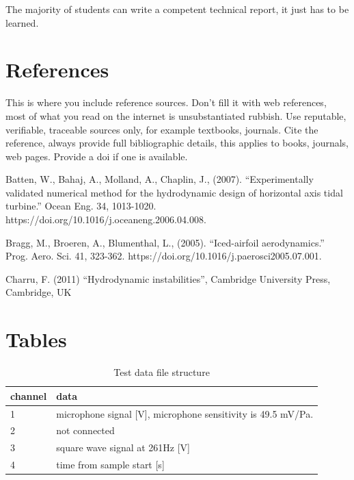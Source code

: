 \documentclass[11pt,a4]{article}
\begin{document}
The majority of students can write a competent technical report, it just has to be learned.

\section{References}

This is where you include reference sources. Don't fill it with web references, most of what you read on the internet is unsubstantiated rubbish. Use reputable, verifiable, traceable sources only, for example textbooks, journals. Cite the reference, always provide full bibliographic details, this applies to books, journals, web pages. Provide a doi if one is available.

Batten, W., Bahaj, A., Molland, A., Chaplin, J., (2007). ``Experimentally validated numerical method for the hydrodynamic design of horizontal axis tidal turbine.'' Ocean Eng. 34, 1013-1020. https://doi.org/10.1016/j.oceaneng.2006.04.008.

Bragg, M., Broeren, A., Blumenthal, L., (2005). ``Iced-airfoil aerodynamics.'' Prog. Aero. Sci. 41, 323-362. https://doi.org/10.1016/j.paerosci2005.07.001.

Charru, F. (2011) ``Hydrodynamic instabilities'', Cambridge University Press, Cambridge, UK





\section{Tables}


\begin{longtable}{ll}
\caption{Test data file structure}\\
\label{tab:struct}
channel & data\\
\hline
1 & microphone signal [V], microphone sensitivity is 49.5 mV/Pa. \\
2 & not connected\\
3 & square wave signal at 261Hz [V] \\
4 & time from sample start [s]\\
\hline
\end{longtable}
\end{document}
